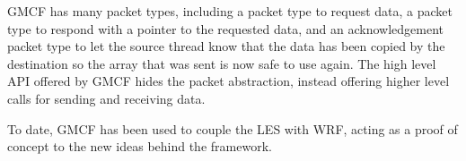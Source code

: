 GMCF has many packet types, including a packet type to request data, a packet
type to respond with a pointer to the requested data, and an acknowledgement
packet type to let the source thread know that the data has been copied by the
destination so the array that was sent is now safe to use again. The high level
API offered by GMCF hides the packet abstraction, instead offering higher level
calls for sending and receiving data.

To date, GMCF has been used to couple the LES with WRF, acting as a proof of
concept to the new ideas behind the framework.
